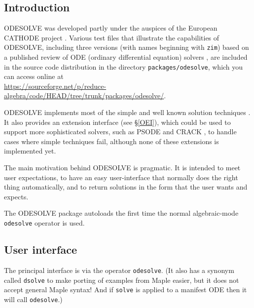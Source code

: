 


\newcommand{\odesolve}{\texttt{odesolve}}


\subsection{Introduction}

ODESOLVE \cite{MacCallum:88,MacCallum:ODESOLVE,Wright:97,Wright:99}
was developed partly under the auspices of the European CATHODE
project \cite{CATHODE}.  Various test files that illustrate the
capabilities of ODESOLVE, including three versions (with names
beginning with \texttt{zim}) based on a published review of ODE
(ordinary differential equation) solvers \cite{PostelZimmermann:96},
are included in the source code distribution in the directory
\texttt{packages/odesolve}, which you can access online at\\
\url{https://sourceforge.net/p/reduce-algebra/code/HEAD/tree/trunk/packages/odesolve/}.

ODESOLVE implements most of the simple and well known solution
techniques \cite{Zwillinger:92}.  It also provides an extension
interface (see \S\ref{OEI}), which could be used to support more
sophisticated solvers, such as PSODE
\cite{Man:94a,Man:97,PrelleSinger:83} and CRACK \cite{Brand:92}, to
handle cases where simple techniques fail, although none of these
extensions is implemented yet.

The main motivation behind ODESOLVE is pragmatic.  It is intended to
meet user expectations, to have an easy user-interface that normally
does the right thing automatically, and to return solutions in the
form that the user wants and expects.

The ODESOLVE package autoloads the first time the normal
algebraic-mode \odesolve{} operator is used.


\subsection{User interface}
\hypertarget{operator:ODESOLVE}{}
\hypertarget{operator:DSOLVE}{}

The principal interface is via the operator \odesolve.  (It also has a
synonym called \texttt{dsolve} to make porting of examples from Maple
easier, but it does not accept general Maple syntax!  And if
\texttt{solve} is applied to a manifest ODE then it will call
\odesolve.)

